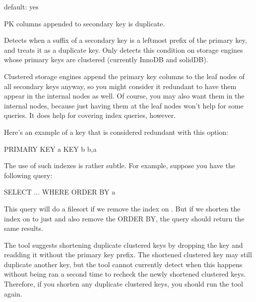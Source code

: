\documentclass[letterpaper,10pt,english]{sphinxmanual}
\begin{document}
\begin{fulllineitems}
\label{\detokenize{mariadb-index-checker:cmdoption-mariadb-index-checker-no-clustered}}
default: yes

PK columns appended to secondary key is duplicate.

Detects when a suffix of a secondary key is a leftmost prefix of the primary
key, and treats it as a duplicate key.  Only detects this condition on storage
engines whose primary keys are clustered (currently InnoDB and solidDB).

Clustered storage engines append the primary key columns to the leaf nodes of
all secondary keys anyway, so you might consider it redundant to have them
appear in the internal nodes as well.  Of course, you may also want them in the
internal nodes, because just having them at the leaf nodes won’t help for some
queries.  It does help for covering index queries, however.

Here’s an example of a key that is considered redundant with this option:

\begin{sphinxVerbatim}[commandchars=\\\{\}]
PRIMARY KEY  a
KEY b b,a
\end{sphinxVerbatim}

The use of such indexes is rather subtle.  For example, suppose you have the
following query:

\begin{sphinxVerbatim}[commandchars=\\\{\}]
SELECT ... WHERE  ORDER BY a
\end{sphinxVerbatim}

This query will do a filesort if we remove the index on .  But if we
shorten the index on  to just  and also remove the ORDER BY, the query
should return the same results.

The tool suggests shortening duplicate clustered keys by dropping the key
and re\sphinxhyphen{}adding it without the primary key prefix.  The shortened clustered
key may still duplicate another key, but the tool cannot currently detect
when this happens without being ran a second time to re\sphinxhyphen{}check the newly
shortened clustered keys.  Therefore, if you shorten any duplicate clustered
keys, you should run the tool again.

\end{fulllineitems}
\end{document}
